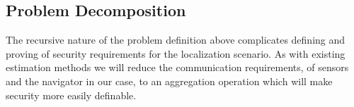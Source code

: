 \documentclass[10pt,letterpaper,oneside,twocolumn,journal]{IEEEtran}
\theoremstyle{definition}
\theoremstyle{definition}
\theoremstyle{remark}
\begin{document}
% 
% 

\subsection{Problem Decomposition} \label{subsec:problem_decomposition}
The recursive nature of the problem definition above complicates defining and proving of security requirements for the localization scenario. As with existing estimation methods \cite{benhamoudaNewFrameworkPrivacyPreserving2016,alexandruEncryptedCooperativeControl2019} we will reduce the communication requirements, of sensors and the navigator in our case, to an aggregation operation which will make security more easily definable. 
\end{document}

